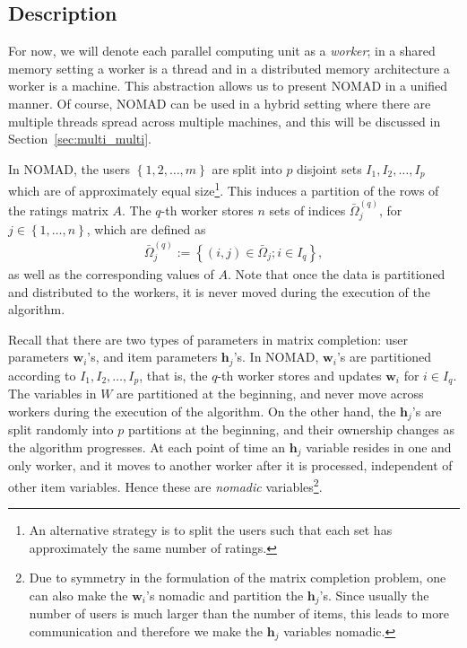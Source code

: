 \documentclass{vldb}
\newcommand{\hb}{\mathbf{h}}
\newcommand{\wb}{\mathbf{w}}
\newcommand{\cbr}[1]{\left\{#1\right\}}
\newcommand{\Omegabar}{\bar{\Omega}}
\begin{document}
\subsection{Description}

For now, we will denote each parallel computing unit as a \emph{worker};
in a shared memory setting a worker is a thread and in a distributed
memory architecture a worker is a machine. This abstraction allows us to
present NOMAD in a unified manner. Of course, NOMAD can be used in a
hybrid setting where there are multiple threads spread across multiple
machines, and this will be discussed in Section~\ref{sec:multi_multi}.

In NOMAD, the users $\cbr{1,2,\ldots,m}$ are split into $p$ disjoint
sets $I_1,I_2,\ldots,I_p$ which are of approximately equal
size\footnote{An alternative strategy is to split the users such that
  each set has approximately the same number of ratings.}. This
induces a partition of the rows of the ratings matrix $A$. The $q$-th
worker stores $n$ sets of indices $\Omegabar_{j}^{(q)}$, for $j \in
\cbr{1, \ldots, n}$, which are defined as
\begin{align*}
  \Omegabar_{j}^{(q)} := \cbr{(i,j) \in \Omegabar_j; i \in I_q },
\end{align*}
as well as the corresponding values of $A$. Note that once the data is
partitioned and distributed to the workers, it is never moved during
the execution of the algorithm. 


Recall that there are two types of parameters in matrix completion:
user parameters $\wb_i$'s, and item parameters $\hb_j$'s.  In NOMAD,
$\wb_i$'s are partitioned according to $I_1, I_2, \ldots, I_p$, that
is, the $q$-th worker stores and updates $\wb_{i}$ for $i \in I_{q}$.
The variables in $W$ are partitioned at the beginning, and never move
across workers during the execution of the algorithm.  On the other
hand, the $\hb_{j}$'s are split randomly into $p$ partitions at the
beginning, and their ownership changes as the algorithm progresses. At
each point of time an $\hb_j$ variable resides in one and only worker,
and it moves to another worker after it is processed, independent of
other item variables.  Hence these are \emph{nomadic}
variables\footnote{Due to symmetry in the formulation of the matrix
  completion problem, one can also make the $\wb_{i}$'s nomadic and
  partition the $\hb_{j}$'s. Since usually the number of users is much
  larger than the number of items, this leads to more communication
  and therefore we make the $\hb_{j}$ variables nomadic.}.
\end{document}
